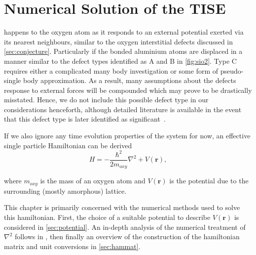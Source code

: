 \chapter{Numerical Solution of the TISE}\label{ch:tise}

 happens to the oxygen atom as it responds to an external potential exerted via its nearest neighbours, similar to the oxygen interstitial defects discussed in \cref{sec:conjecture}.
Particularly if the bonded aluminium atoms are displaced in a manner similar to the defect types identified as A and B in \cref{fig:sio2}.
Type C requires either a complicated many body investigation or some form of pseudo-single body approximation.
As a result, many assumptions about the defects response to external forces will be compounded which may prove to be drastically misstated.
Hence, we do not include this possible defect type in our considerations henceforth, although detailed literature is available in the event that this defect type is later identified as significant~\cite{Buchenau1984,Heuer1998,Trachenko2000,Reinisch2005}.

If we also ignore any time evolution properties of the system for now, an effective single particle Hamiltonian can be derived
\begin{equation}
    H = -\frac{\hbar^2}{2m_{oxy}}\nabla^2+V(\mathbf{r}),
    \label{eq:OHam}
\end{equation}

where $m_{oxy}$ is the mass of an oxygen atom and $V(\mathbf{r})$ is the potential due to the surrounding (mostly amorphous) lattice.

This chapter is primarily concerned with the numerical methods used to solve this hamiltonian.
First, the choice of a suitable potential to describe $V(\mathbf{r})$ is considered in \cref{sec:potential}.
An in-depth analysis of the numerical treatment of $\nabla^2$ follows in , then finally an overview of the construction of the hamiltonian matrix and unit conversions in \cref{sec:hammat}.

